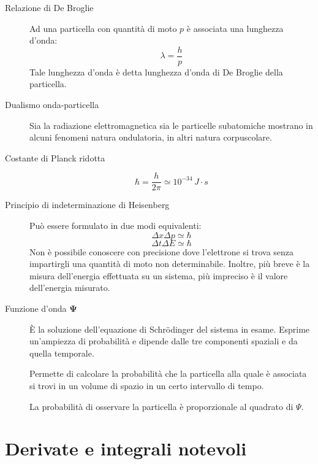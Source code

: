 \documentclass[a4paper,11pt,italian]{article}
\begin{document}
\begin{description}
  \item[Relazione di De Broglie] 
  Ad una particella con quantità di moto $ p $ è associata una lunghezza d'onda:
  \[ \lambda = \frac{h}{p} \] Tale lunghezza d'onda è detta lunghezza d'onda di De Broglie della particella.
  
  \item[Dualismo onda-particella] 
  Sia la radiazione elettromagnetica sia le particelle subatomiche mostrano in alcuni fenomeni natura ondulatoria, in altri natura corpuscolare.
  
  \item[Costante di Planck ridotta] 
  \[ \hbar = \frac{h}{2 \pi} \simeq 10^{-34} \, J\cdot s \]
  
  \item[Principio di indeterminazione di Heisenberg] 
  Può essere formulato in due modi equivalenti: 
  \[ \Delta x \Delta p \simeq \hbar \]
  \[ \Delta t \Delta E \simeq \hbar \]
  Non è possibile conoscere con precisione dove l'elettrone si trova senza impartirgli una quantità di moto non determinabile. Inoltre, più breve è la misura dell'energia effettuata su un sistema, più impreciso è il valore dell'energia misurato.
  
  \item[Funzione d'onda $ \mathbf{\Psi} $]
  È la soluzione dell'equazione di Schrödinger del sistema in esame. Esprime un'ampiezza di probabilità e dipende dalle tre componenti spaziali e da quella temporale.
  
  Permette di calcolare la probabilità che la particella alla quale è associata si trovi in un volume di spazio in un certo intervallo di tempo.
  
  La probabilità di osservare la particella è proporzionale al quadrato di $ \Psi $.
\end{description}


\newpage
\section{Derivate e integrali notevoli}
\end{document}

